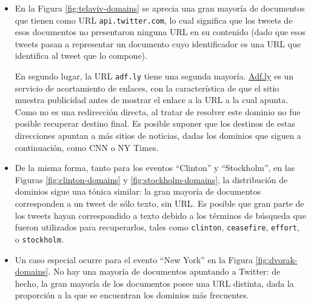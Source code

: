 \begin{itemize}
\item En la Figura \ref{fig:telaviv-domains} se aprecia una gran
      mayoría de documentos que tienen como URL \texttt{api.twitter.com}, lo
      cual significa que los tweets de esos documentos no presentaron
      ninguna URL en su contenido (dado que esos tweets pasan a
      representar un documento cuyo identificador es una URL que
      identifica al tweet que lo compone).

      En segundo lugar, la URL \texttt{adf.ly} tiene una segunda
      mayoría. \hyperref[sec-4.4.1]{Adf.ly} es un servicio de acortamiento de enlaces, con
      la característica de que el sitio muestra publicidad antes de
      mostrar el enlace a la URL a la cual apunta. Como no es una
      redirección directa, al tratar de resolver este dominio no fue
      posible recuperar destino final. Es posible suponer que los
      destinos de estas direcciones apuntan a más sitios de noticias,
      dadas los dominios que siguen a continuación, como CNN o NY
      Times.
\item De la misma forma, tanto para los eventos ``Clinton'' y
      ``Stockholm'', en las Figuras \ref{fig:clinton-domains} y
      \ref{fig:stockholm-domains}, la distribución de dominios sigue una tónica
      similar: la gran mayoría de documentos corresponden a un tweet
      de sólo texto, sin URL. Es posible que gran parte de los tweets
      hayan correspondido a texto debido a los términos de búsqueda
      que fueron utilizados para recuperarlos, tales como \texttt{clinton},
      \texttt{ceasefire}, \texttt{effort}, o \texttt{stockholm}.
\item Un caso especial ocurre para el evento ``New York'' en la Figura
      \ref{fig:dvorak-domains}. No hay una mayoría de documentos
      apuntando a Twitter: de hecho, la gran mayoría de los documentos
      posee una URL distinta, dada la proporción a la que se
      encuentran los dominios más frecuentes.
\end{itemize}
